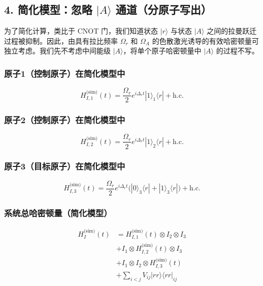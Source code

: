 \documentclass[12pt]{article}
\begin{document}
	\subsection*{4. 简化模型：忽略 $|A\rangle$ 通道（分原子写出）}
	为了简化计算，类比于 CNOT 门，我们知道状态 $|r\rangle$ 与状态 $|A\rangle$ 之间的拉曼跃迁过程被抑制。因此，由具有拉比频率 $\Omega_r$ 和 $\Omega_A$ 的色散激光诱导的有效哈密顿量可独立考虑。我们先不考虑中间能级 $|A\rangle$，将单个原子哈密顿量中 $|A\rangle$ 的过程不写。
	
	\subsubsection*{原子1（控制原子）在简化模型中}
	\begin{equation}
		H_{I,1}^{\text{(sim)}}(t) = \frac{\Omega_r}{2} e^{i\Delta_r t} |1\rangle_1\langle r| + \text{h.c.}
	\end{equation}
	
	\subsubsection*{原子2（控制原子）在简化模型中}
	\begin{equation}
		H_{I,2}^{\text{(sim)}}(t) = \frac{\Omega_r}{2} e^{i\Delta_r t} |1\rangle_2\langle r| + \text{h.c.}
	\end{equation}
	
	\subsubsection*{原子3（目标原子）在简化模型中}
	\begin{equation}
		H_{I,3}^{\text{(sim)}}(t) = \frac{\Omega_r}{2} e^{i\Delta_r t} \big( |0\rangle_3\langle r| + |1\rangle_3\langle r| \big) + \text{h.c.}
	\end{equation}
	
	\subsubsection*{系统总哈密顿量（简化模型）}
	\begin{equation}
		\begin{aligned}
			H_I^{\text{(sim)}}(t) &= H_{I,1}^{\text{(sim)}}(t) \otimes I_2 \otimes I_3 \\
			&+ I_1 \otimes H_{I,2}^{\text{(sim)}}(t) \otimes I_3 \\
			&+ I_1 \otimes I_2 \otimes H_{I,3}^{\text{(sim)}}(t) \\
			&+ \sum_{i<j} V_{ij} |rr\rangle\langle rr|_{ij}
		\end{aligned}
	\end{equation}
	
\end{document}
